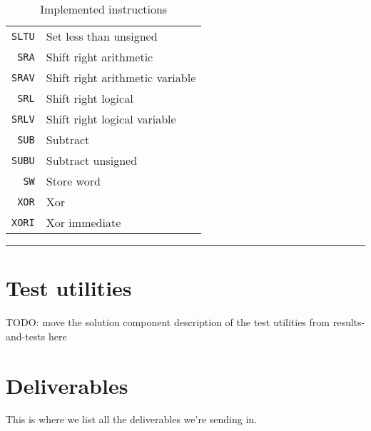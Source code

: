 \begin{table}
\begin{center}
\begin{tabular}{r|l}
            \texttt{SLTU} & Set less than unsigned \\
            \texttt{SRA} & Shift right arithmetic \\
            \texttt{SRAV} & Shift right arithmetic variable \\
            \texttt{SRL} & Shift right logical \\
            \texttt{SRLV} & Shift right logical variable \\
            \texttt{SUB} & Subtract \\
            \texttt{SUBU} & Subtract unsigned \\
            \texttt{SW} & Store word \\
            \texttt{XOR} & Xor \\
            \texttt{XORI} & Xor immediate \\
        \end{tabular}
        \smallskip
        \hrule
        \smallskip
        \caption{Implemented instructions}
        \label{table:implemented-instructions}
    \end{center}
\end{table}

\section{Test utilities}

TODO: move the solution component description of the test utilities from results-and-tests here

\section{Deliverables}

This is where we list all the deliverables we're sending in.
